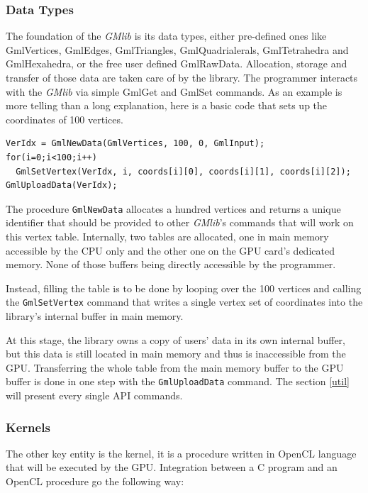 \documentclass[a4paper,12pt]{article}
\begin{document}
\subsubsection*{Data Types}
The foundation of the \emph{GMlib} is its data types, either pre-defined ones like GmlVertices, GmlEdges, GmlTriangles, GmlQuadrialerals, GmlTetrahedra and GmlHexahedra, or the free user defined GmlRawData. Allocation, storage and transfer of those data are taken care of by the library. The programmer interacts with the \emph{GMlib} via simple GmlGet and GmlSet commands. As an example is more telling than a long explanation, here is a basic code that sets up the coordinates of 100 vertices.

\begin{tt}
\begin{verbatim}
VerIdx = GmlNewData(GmlVertices, 100, 0, GmlInput);
for(i=0;i<100;i++)
  GmlSetVertex(VerIdx, i, coords[i][0], coords[i][1], coords[i][2]);
GmlUploadData(VerIdx);
\end{verbatim}
\end{tt}
\normalfont

The procedure {\tt GmlNewData} allocates a hundred vertices and returns a unique identifier that should be provided to other \emph{GMlib}'s commands that will work on this vertex table. Internally, two tables are allocated, one in main memory accessible by the CPU only and the other one on the GPU card's dedicated memory. None of those buffers being directly accessible by the programmer.

Instead, filling the table is to be done by looping over the 100 vertices and calling the {\tt GmlSetVertex} command that writes a single vertex set of coordinates into the library's internal buffer in main memory.

At this stage, the library owns a copy of users' data in its own internal buffer, but this data is still located in main memory and thus is inaccessible from the GPU. Transferring the whole table from the main memory buffer to the GPU buffer is done in one step with the {\tt GmlUploadData} command. The section \ref{util} will present every single API commands.

\subsubsection*{Kernels}
The other key entity is the kernel, it is a procedure written in OpenCL language that will be executed by the GPU. Integration between a C program and an OpenCL procedure go the following way:
\end{document}
